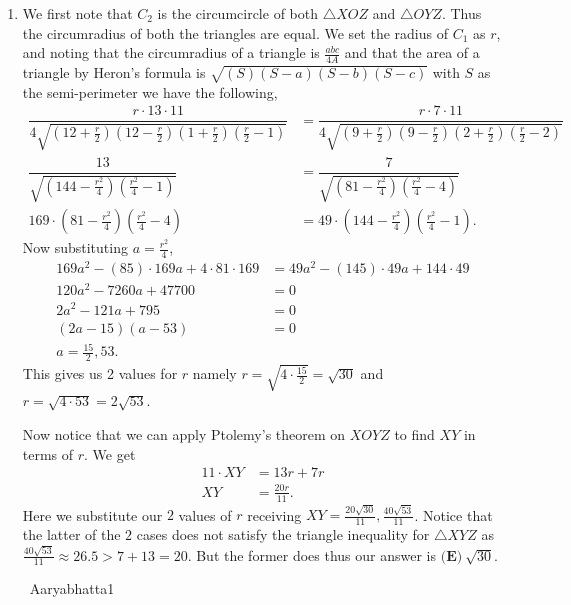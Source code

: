 \documentclass{article}%
\begin{document}
\begin{enumerate}
%
\item%
We first note that $C_2$ is the circumcircle of both $\triangle XOZ$ and $\triangle OYZ$. Thus the circumradius of both the triangles are equal. We set the radius of $C_1$ as $r$, and noting that the circumradius of a triangle is $\frac{abc}{4A}$ and that the area of a triangle by Heron's formula is $\sqrt{(S)(S-a)(S-b)(S-c)}$ with $S$ as the semi-perimeter we have the following, \begin{align*}\dfrac{r \cdot 13 \cdot 11}{4\sqrt{(12 + \frac{r}{2})(12 - \frac{r}{2})(1 + \frac{r}{2})(\frac{r}{2} - 1)}} &= \dfrac{r \cdot 7 \cdot 11}{4\sqrt{(9 + \frac{r}{2})(9 - \frac{r}{2})(2 + \frac{r}{2})(\frac{r}{2} - 2)}} \\ \dfrac{13}{\sqrt{(144- \frac{r^2}{4})(\frac{r^2}{4} - 1)}} &= \dfrac{7}{\sqrt{(81- \frac{r^2}{4})(\frac{r^2}{4} - 4)}} \\ 169 \cdot (81 - \frac{r^2}{4})(\frac{r^2}{4} - 4) &= 49 \cdot (144 - \frac{r^2}{4})(\frac{r^2}{4} - 1) .\end{align*}
Now substituting $a = \frac{r^2}{4}$, \begin{align*}169a^2 - (85) \cdot 169 a + 4 \cdot 81 \cdot 169 &= 49a^2 - (145) \cdot 49 a + 144 \cdot 49 \\ 120a^2 - 7260a + 47700 &= 0 \\ 2a^2 - 121a + 795 &= 0 \\ (2a-15)(a-53) &= 0 \\ a = \frac{15}{2}, 53.\end{align*}
This gives us 2 values for $r$ namely $r = \sqrt{4 \cdot \frac{15}{2}} = \sqrt{30}$ and $r = \sqrt{4 \cdot 53} = 2\sqrt{53}$.

Now notice that we can apply Ptolemy's theorem on $XOYZ$ to find $XY$ in terms of $r$. We get \begin{align*}11 \cdot XY &= 13r + 7r \\ XY &= \frac{20r}{11}.\end{align*}
Here we substitute our $2$ values of $r$ receiving $XY = \frac{20\sqrt{30}}{11}, \frac{40\sqrt{53}}{11}$. Notice that the latter of the $2$ cases does not satisfy the triangle inequality for $\triangle XYZ$ as $\frac{40\sqrt{53}}{11} \approx 26.5 > 7 + 13 = 20$. But the former does thus our answer is $\textbf{(E)}\ \boxed{\sqrt{30}}$. 

~Aaryabhatta1

%
\end{enumerate}

%
\end{document}
